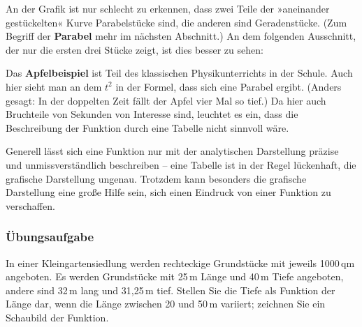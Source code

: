 An der Grafik ist nur schlecht zu erkennen, dass zwei Teile der »aneinander gestückelten« Kurve Parabelstücke sind, die anderen sind Geradenstücke. (Zum Begriff der \textbf{Parabel} mehr im nächsten Abschnitt.) An dem folgenden Ausschnitt, der nur die ersten drei Stücke zeigt, ist dies besser zu sehen:

\begin{center}
\end{center}

Das \textbf{Apfelbeispiel} ist Teil des klassischen Physikunterrichts in der Schule. Auch hier sieht man an dem $t^2$ in der Formel, dass sich eine Parabel ergibt. (Anders gesagt: In der doppelten Zeit fällt der Apfel vier Mal so tief.) Da hier auch Bruchteile von Sekunden von Interesse sind, leuchtet es ein, dass die Beschreibung der Funktion durch eine Tabelle nicht sinnvoll wäre.

Generell lässt sich eine Funktion nur mit der analytischen Darstellung präzise und unmissverständlich beschreiben -- eine Tabelle ist in der Regel lückenhaft, die grafische Darstellung ungenau. Trotzdem kann besonders die grafische Darstellung eine große Hilfe sein, sich einen Eindruck von einer Funktion zu verschaffen.

\subsubsection{Übungsaufgabe}

\begin{graukasten}
  In einer Kleingartensiedlung werden rechteckige Grundstücke mit jeweils 1000\,qm angeboten. Es werden Grundstücke mit 25\,m Länge und 40\,m Tiefe angeboten, andere sind 32\,m lang und 31{,}25\,m tief. Stellen Sie die Tiefe als Funktion der Länge dar, wenn die Länge zwischen 20 und 50\,m variiert; zeichnen Sie ein Schaubild der Funktion.
\end{graukasten}

